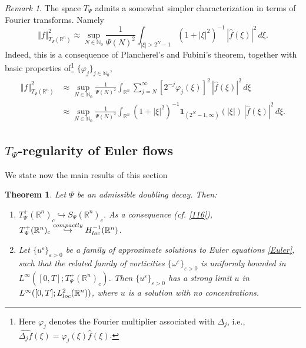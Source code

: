 \documentclass[11pt, a4paper,leqno]{amsart}
\newtheorem{theorem}{Theorem}
\theoremstyle{plain}
\numberwithin{equation}{section}
\theoremstyle{definition}
\theoremstyle{remark}
\newtheorem{remark}{Remark}
\def\R{\mathbb{R}}
\begin{document}
\begin{remark}
The space $T_{\Psi}$ admits a somewhat simpler characterization in terms of
Fourier transforms. Namely
\[
\Vert f\Vert_{T_{\Psi}(\mathbb{R}^{n})}^{2}\approx\sup_{N\in\mathbb{N}_{0}%
}\frac{1}{\Psi(N)^{2}}\int_{|\xi|>2^{N}-1}(1+|\xi|^{2})^{-1}\,|\widehat{f}%
(\xi)|^{2}\,d\xi.
\]
Indeed, this is a consequence of Plancherel's and Fubini's theorem, together
with basic properties of\footnote{Here $\varphi_j$ denotes the Fourier multiplier associated with $\Delta_j$, i.e., $\widehat{\Delta_j f}(\xi) = \varphi_j(\xi) \widehat{f}(\xi)$.} $\{\varphi_{j}\}_{j\in\mathbb{N}_{0}}$,
\begin{align*}
\Vert f\Vert_{T_{\Psi}(\mathbb{R}^{n})}^{2}  &  \approx\sup_{N\in
\mathbb{N}_{0}}\frac{1}{\Psi(N)^{2}}\int_{\mathbb{R}^{n}}\sum_{j=N}^{\infty
}[2^{-j}\varphi_{j}(\xi)]^{2}\,|\widehat{f}(\xi)|^{2}\,d\xi\\
&  \approx\sup_{N\in\mathbb{N}_{0}}\frac{1}{\Psi(N)^{2}}\int_{\mathbb{R}^{n}%
}(1+|\xi|^{2})^{-1}\mathbf{1}_{(2^{N}-1,\infty)}(|\xi|)\,|\widehat{f}%
(\xi)|^{2}\,d\xi.
\end{align*}
\end{remark}



\subsection{$T_\Psi$-regularity of Euler flows} We state now the main results of this section


\begin{theorem}\label{ThmTPsi} 
Let $\Psi$ be an admissible doubling decay.  
Then:
	\begin{enumerate}
		\item[(i)]  $T^+_\Psi(\R^n)_c \hookrightarrow S_\Psi(\R^n)_{c}$. As a consequence (cf. \eqref{116}), $T^+_\Psi(\R^n)_c\overset{compactly}{\hookrightarrow}H^{-1}_{\emph{loc}}(\R^n
)$. 
		\item[(ii)] Let $\{u^\varepsilon\}_{\varepsilon > 0}$ be a family of approximate solutions to Euler equations \eqref{Euler}, such that the related family of vorticities $\{\omega^\varepsilon\}_{\varepsilon > 0}$ is uniformly bounded in $L^\infty([0, T]; T^+_\Psi(\R^n)_c)$. Then $\{u^\varepsilon\}_{\varepsilon > 0}$ has a strong limit $u$ in $L^\infty([0, T]; L^2_{\emph{loc}}(\R^n))$, where $u$ is a solution with no concentrations. 
	\end{enumerate}
\end{theorem}
\end{document}
